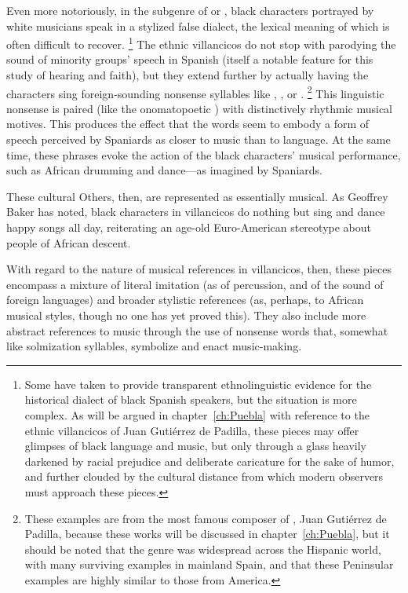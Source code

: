 Even more notoriously, in the subgenre of  or , black characters portrayed by white musicians speak in a stylized false dialect, the lexical meaning of which is often difficult to recover.%
	\footnote{%
Some have taken  to provide transparent ethnolinguistic evidence for the historical dialect of black Spanish speakers, but the situation is more complex.
As will be argued in chapter~\ref{ch:Puebla} with reference to the ethnic villancicos of Juan Gutiérrez de Padilla, these pieces may offer glimpses of black language and music, but only through a glass heavily darkened by racial prejudice and deliberate caricature for the sake of humor, and further clouded by the cultural distance from which modern observers must approach these pieces. 
	}
The ethnic villancicos do not stop with parodying the sound of minority groups' speech in Spanish (itself a notable feature for this study of hearing and faith), but they extend further by actually having the characters sing foreign-sounding nonsense syllables like , , or .%
	\footnote{%
	These examples are from the most famous composer of , Juan Gutiérrez de Padilla, because these works will be discussed in chapter~\ref{ch:Puebla}, but it should be noted that the  genre was widespread across the Hispanic world, with many surviving examples in mainland Spain, and that these Peninsular examples are highly similar to those from America. 
	}
This linguistic nonsense is paired (like the onomatopoetic ) with distinctively rhythmic musical motives. 
This produces the effect that the words seem to embody a form of speech perceived by Spaniards as closer to music than to language.
At the same time, these phrases evoke the action of the black characters' musical performance, such as African drumming and dance---as imagined by Spaniards.

These cultural Others, then, are represented as essentially musical.
As Geoffrey Baker has noted, black characters in villancicos do nothing but sing and dance happy songs all day, reiterating an age-old Euro-American stereotype about people of African descent.%
	\autocite{Baker:EthnicVC}

With regard to the nature of musical references in  villancicos, then, these pieces encompass a mixture of literal imitation (as of percussion, and of the  sound of foreign languages) and broader stylistic references (as, perhaps, to African musical styles, though no one has yet proved this). 
They also include more abstract references to music through the use of nonsense words that, somewhat like solmization syllables, symbolize and enact music-making.


